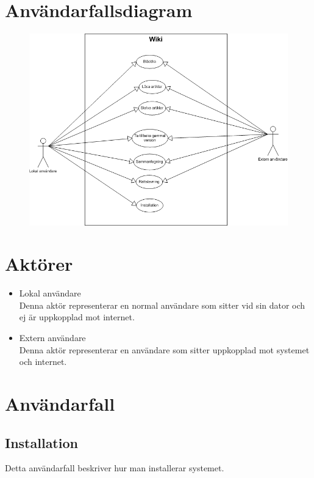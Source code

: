\section{Användarfallsdiagram}
 \begin{figure}[H] %
  \centering
  \includegraphics[scale=0.50]{Use-case-diagram.png}
\end{figure}
\section{Aktörer}
\begin{itemize}
	\item Lokal användare
	\\Denna aktör representerar en normal användare som sitter vid sin dator och ej är uppkopplad mot internet.
	\item Extern användare
	\\Denna aktör representerar en användare som sitter uppkopplad mot systemet och internet.
\end{itemize}
\newpage
\section{Användarfall}
\subsection{Installation}
Detta användarfall beskriver hur man installerar systemet.
